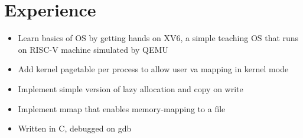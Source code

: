 \section{Experience}



{} {} {}
\begin{itemize}
\setlength\topsep{-0.1em}
\setlength\parskip{-0.1em}
\setlength\parsep{-0.1em}
\setlength\itemsep{-0.1em}
  \item Learn basics of OS by getting hands on XV6, a simple teaching OS that runs on RISC-V machine simulated by QEMU
  \item Add kernel pagetable per process to allow user va mapping in kernel mode  
  \item Implement simple version of lazy allocation and copy on write
  \item Implement mmap that enables memory-mapping to a file
  \item Written in C, debugged on gdb
\end{itemize}


